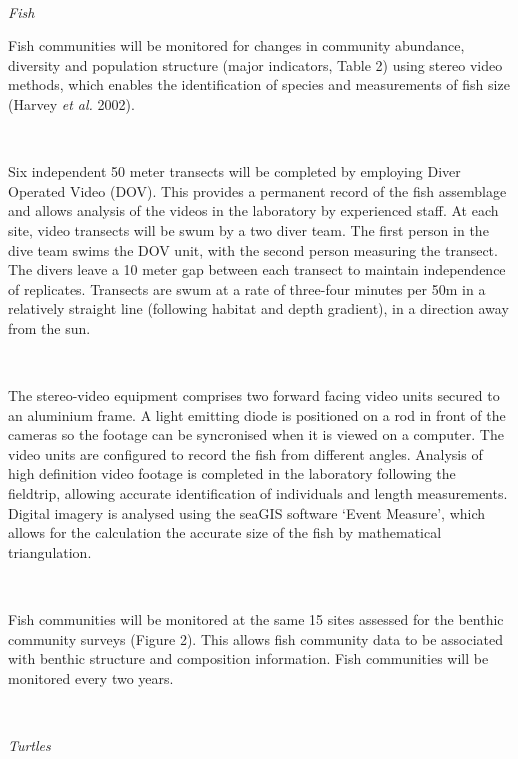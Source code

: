 \documentclass[version=last,
    paper=a4,                               %
    10pt,                                   %
    dvipsnames,
    oneside,                              %
    headings=openany,                       %
    open=any,
    BCOR=7mm,                               %
    DIV=15,     %
]{scrbook}
\begin{document}
~

\emph{Fish}

Fish communities will be monitored for changes in community abundance,
diversity and population structure (major indicators, Table 2) using
stereo video methods, which enables the identification of species and
measurements of fish size (Harvey \emph{et al.} 2002).

~

Six independent 50 meter transects will be completed by employing Diver
Operated Video (DOV). This provides a permanent record of the fish
assemblage and allows analysis of the videos in the laboratory by
experienced staff. At each site, video transects will be swum by a two
diver team. The first person in the dive team swims the DOV unit, with
the second person measuring the transect. The divers leave a 10 meter
gap between each transect to maintain independence of replicates.
Transects are swum at a rate of three-four minutes per 50m in a
relatively straight line (following habitat and depth gradient), in a
direction away from the sun.

~

The stereo-video equipment comprises two forward facing video units
secured to an aluminium frame. A light emitting diode is positioned on a
rod in front of the cameras so the footage can be syncronised when it is
viewed on a computer. The video units are configured to record the fish
from different angles. Analysis of high definition video footage is
completed in the laboratory following the fieldtrip, allowing accurate
identification of individuals and length measurements. Digital imagery
is analysed using the seaGIS software `Event Measure', which allows for
the calculation the accurate size of the fish by mathematical
triangulation.

~

Fish communities will be monitored at the same 15 sites assessed for the
benthic community surveys (Figure 2). This allows fish community data to
be associated with benthic structure and composition information. Fish
communities will be monitored every two years.

~

\emph{Turtles}
\end{document}
